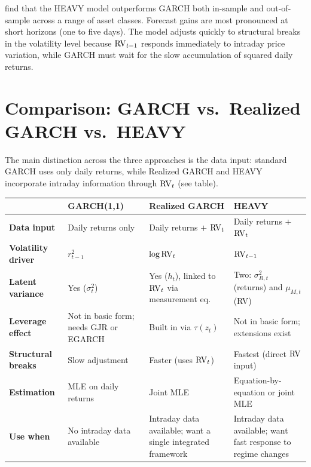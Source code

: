 \begin{keyresult}
\citet{shephard2010heavy} find that the HEAVY model outperforms GARCH both in-sample
and out-of-sample across a range of asset classes. Forecast gains are most pronounced
at short horizons (one to five days). The model adjusts quickly to structural breaks
in the volatility level because $\operatorname{RV}_{t-1}$ responds immediately to intraday price
variation, while GARCH must wait for the slow accumulation of squared daily returns.
\end{keyresult}


\section{Comparison: GARCH vs.\ Realized GARCH vs.\ HEAVY}
\label{sec:comparison}

The main distinction across the three approaches is the data input: standard GARCH
uses only daily returns, while Realized GARCH and HEAVY incorporate intraday
information through $\operatorname{RV}_t$ (see table).

\begin{center}
\renewcommand{\arraystretch}{1.3}
\begin{tabular}{@{} l p{3.2cm} p{3.2cm} p{3.2cm} @{}}
\toprule
& \textbf{GARCH(1,1)} & \textbf{Realized GARCH} & \textbf{HEAVY} \\
\midrule
\textbf{Data input}
  & Daily returns only
  & Daily returns $+$ $\operatorname{RV}_t$
  & Daily returns $+$ $\operatorname{RV}_t$ \\[2pt]
\textbf{Volatility driver}
  & $r^2_{t-1}$
  & $\log \operatorname{RV}_t$
  & $\operatorname{RV}_{t-1}$ \\[2pt]
\textbf{Latent variance}
  & Yes ($\sigma^2_t$)
  & Yes ($h_t$), linked to $\operatorname{RV}_t$ via measurement eq.
  & Two: $\sigma^2_{R,t}$ (returns) and $\mu_{M,t}$ (RV) \\[2pt]
\textbf{Leverage effect}
  & Not in basic form; needs GJR or EGARCH
  & Built in via $\tau(z_t)$
  & Not in basic form; extensions exist \\[2pt]
\textbf{Structural breaks}
  & Slow adjustment
  & Faster (uses $\operatorname{RV}_t$)
  & Fastest (direct $\operatorname{RV}$ input) \\[2pt]
\textbf{Estimation}
  & MLE on daily returns
  & Joint MLE
  & Equation-by-equation or joint MLE \\[2pt]
\textbf{Use when}
  & No intraday data available
  & Intraday data available; want a single integrated framework
  & Intraday data available; want fast response to regime changes \\
\bottomrule
\end{tabular}
\end{center}

